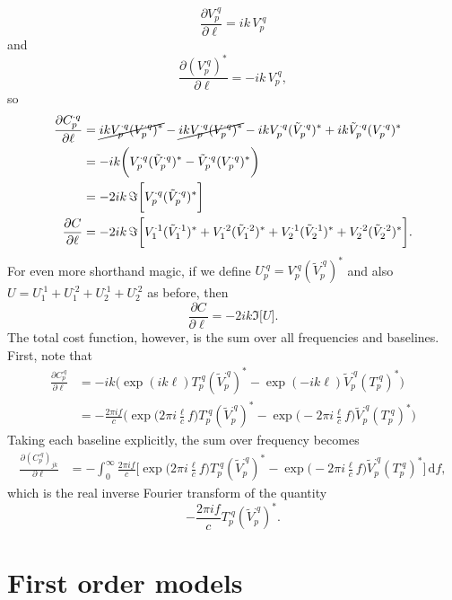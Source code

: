 \documentclass{book}
\newcommand{\pd}[2]{\frac{\partial {#1}}{\partial {#2}}}
\begin{document}
\[
    \pd{V_p^{\cdot q}}{\ell} = ik \, V_p^{\cdot q}
\]
and
\[
    \pd{(V_p^{\cdot q})^\ast}{\ell} = -ik \, V_p^{\cdot q},
\]
so
\begin{align*}
    \pd{C_p^{\cdot q}}{\ell}
        &= \cancel{ik V_p^{\cdot q} (V_p^{\cdot q})^\ast} - \cancel{ik V_p^{\cdot q} (V_p^{\cdot q})^\ast} -
           ik V_p^{\cdot q} (\tilde{V}_p^{\cdot q})^\ast + ik\tilde{V}_p^{\cdot q}(V_p^{\cdot q})^\ast \\
        &= -ik \bigg(V_p^{\cdot q} (\tilde{V}_p^{\cdot q})^\ast - \tilde{V}_p^{\cdot q}(V_p^{\cdot q})^\ast\bigg) \\
        &= -2ik \, \Im \bigg[V_p^{\cdot q} (\tilde{V}_p^{\cdot q})^\ast\bigg] \\
    \pd{C}{\ell}
        &= -2ik \, \Im \bigg[
               V_1^{\cdot 1} (\tilde{V}_1^{\cdot 1})^\ast +
               V_1^{\cdot 2} (\tilde{V}_1^{\cdot 2})^\ast +
               V_2^{\cdot 1} (\tilde{V}_2^{\cdot 1})^\ast +
               V_2^{\cdot 2} (\tilde{V}_2^{\cdot 2})^\ast
           \bigg].
\end{align*}
For even more shorthand magic, if we define $U_p^{\cdot q} = V_p^{\cdot q} (\tilde{V}_p^{\cdot q})^\ast$ and also $U = U_1^{\cdot 1} + U_1^{\cdot 2} + U_2^{\cdot 1} + U_2^{\cdot 2}$ as before, then
\[
    \pd{C}{\ell} = -2ik \Im \bigg[ U \bigg].
\]
The total cost function, however, is the sum over all frequencies and baselines.
First, note that
\begin{align*}
    \pd{C_p^{\cdot q}}{\ell}
        &= -ik \bigg(\exp(ik\ell) T_p^{\cdot q} (\tilde{V}_p^{\cdot q})^\ast - \exp(-ik\ell)\tilde{V}_p^{\cdot q}(T_p^{\cdot q})^\ast\bigg) \\
        &= -\frac{2\pi i f}{c} \bigg(\exp\bigg(2\pi i\frac{\ell}{c}f\bigg) T_p^{\cdot q} (\tilde{V}_p^{\cdot q})^\ast - \exp\bigg(-2\pi i\frac{\ell}{c} f\bigg)\tilde{V}_p^{\cdot q}(T_p^{\cdot q})^\ast\bigg)
\end{align*}
Taking each baseline explicitly, the sum over frequency becomes
\begin{align*}
    \pd{(C_p^{\cdot q})_{jk}}{\ell}
        &= -\int_0^\infty \frac{2\pi if}{c} \bigg[\exp\bigg(2\pi i\frac{\ell}{c}f\bigg) T_p^{\cdot q} (\tilde{V}_p^{\cdot q})^\ast - \exp\bigg(-2\pi i\frac{\ell}{c} f\bigg)\tilde{V}_p^{\cdot q}(T_p^{\cdot q})^\ast\bigg] \,\text{d}f,
\end{align*}
which is the real inverse Fourier transform of the quantity
\[
    -\frac{2\pi i f}{c} T_p^{\cdot q} (\tilde{V}_p^{\cdot q})^\ast.
\]

\section{First order models}
\end{document}
